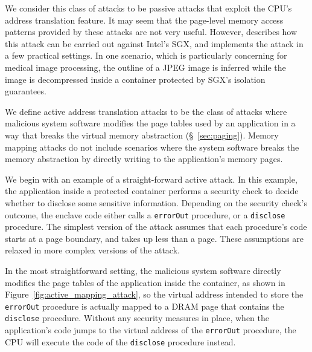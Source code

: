 We consider this class of attacks to be passive attacks that exploit the CPU's
address translation feature. It may seem that the page-level memory access
patterns provided by these attacks are not very useful. However,
\cite{xu2015pagefaults} describes how this attack can be carried out against
Intel's SGX, and implements the attack in a few practical settings. In one
scenario, which is particularly concerning for medical image processing,
the outline of a JPEG image is inferred while the image is decompressed inside
a container protected by SGX's isolation guarantees.


\label{sec:memory_mapping_attacks}

We define active address translation attacks to be the class of attacks where
malicious system software modifies the page tables used by an application in
a way that breaks the virtual memory abstraction (\S~\ref{sec:paging}). Memory
mapping attacks do not include scenarios where the system software breaks the
memory abstraction by directly writing to the application's memory pages.

We begin with an example of a straight-forward active attack. In this example,
the application inside a protected container performs a security check to
decide whether to disclose some sensitive information. Depending on the
security check's outcome, the enclave code either calls a \texttt{errorOut}
procedure, or a \texttt{disclose} procedure. The simplest version of the attack
assumes that each procedure's code starts at a page boundary, and takes up less
than a page. These assumptions are relaxed in more complex versions of the
attack.

In the most straightforward setting, the malicious system software directly
modifies the page tables of the application inside the container, as shown in
Figure~\ref{fig:active_mapping_attack}, so the virtual address intended to
store the \texttt{errorOut} procedure is actually mapped to a DRAM page that
contains the \texttt{disclose} procedure. Without any security measures in
place, when the application's code jumps to the virtual address of the
\texttt{errorOut} procedure, the CPU will execute the code of the
\texttt{disclose} procedure instead.

